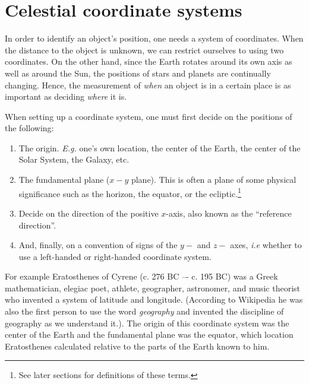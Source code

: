 \chapter{Celestial coordinate systems}

In order to identify an object's position, one needs a system of coordinates.
When the distance to the object is unknown, we can restrict ourselves to using two
coordinates. 
On the other hand, since the Earth rotates around its 
own axis as well as around the Sun, the positions of stars and planets 
are continually changing. Hence, the measurement of {\it when} an object 
is in a certain place is as important as deciding {\it where} it is. 

When setting up a coordinate system, one must first decide on the positions
of the following:
\begin{enumerate}
\item The origin. {\it E.g.} one's own location, the center of the Earth,
the center of the Solar System, the Galaxy, etc. 
\item The fundamental plane ($x-y$ plane). This is often a plane of some
	physical significance such as the horizon, the equator, or the
	ecliptic.\footnote{See later sections for definitions of these terms.}
\item Decide on the direction of the positive $x$-axis, also known as
the ``reference direction''. 
\item And, finally, on a convention of signs of the $y-$ and $z-$ axes, {\it i.e} whether
to use a left-handed or right-handed coordinate system.
\end{enumerate}

For example Eratosthenes of Cyrene (c. 276 BC –- c. 195 BC) was a Greek mathematician, elegiac poet, athlete, geographer, astronomer, and music theorist who invented a system of latitude
and longitude. (According to Wikipedia he was also the first person to use the word {\it geography} and invented the discipline of geography as we understand it.). The origin of 
this coordinate system was the center of the Earth and the fundamental plane was the 
equator, which location Eratosthenes calculated relative to the parts of the Earth known
to him. 

